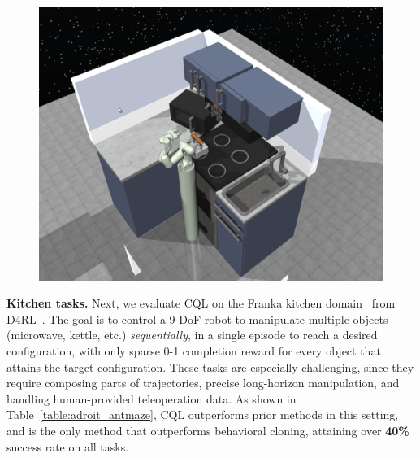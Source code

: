 \begin{figure}
  \vspace{-25pt}
  \begin{center}
  \includegraphics[width=0.99\linewidth]{chapters/cql/images/adept_franka_kitchen.png}
  \end{center}
  \vspace{-20pt}
\end{figure}
\textbf{Kitchen tasks.} Next, we evaluate CQL on the Franka kitchen domain~\citep{gupta2019relay} from D4RL~\citep{d4rl_repo}.
The goal is to control a 9-DoF robot to manipulate multiple objects (microwave, kettle, etc.) \textit{sequentially}, in a single episode to reach a desired configuration, with only sparse 0-1 completion reward for every object that attains the target configuration. These tasks are especially challenging, since they require composing parts of trajectories, precise long-horizon manipulation, and handling human-provided teleoperation data. As shown in Table~\ref{table:adroit_antmaze}, CQL outperforms prior methods in this setting, and is the only method that outperforms behavioral cloning, attaining over \textbf{40\%} success rate on all tasks.



